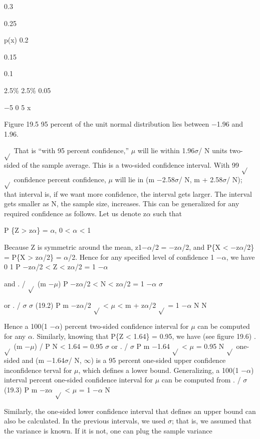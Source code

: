 0.3

0.25

p(x) 0.2

0.15

0.1

2.5\% 2.5\% 0.05

$-$5 0 5 x

Figure 19.5 95 percent of the unit normal distribution lies between $-$1.96 and 1.96.

$\sqrt{}$ That is “with 95 percent confidence,” $\mu$ will lie within 1.96$\sigma$/ N units two-sided of the sample average. This is a two-sided confidence interval. With 99 $\sqrt{}$ $\sqrt{}$ confidence percent confidence, $\mu$ will lie in (m $-$2.58$\sigma$/ N, m + 2.58$\sigma$/ N); that interval is, if we want more confidence, the interval gets larger. The interval gets smaller as N, the sample size, increases. This can be generalized for any required confidence as follows. Let us denote z$\alpha$ such that

P \{Z > z$\alpha$\} = $\alpha$, 0 < $\alpha$ < 1

Because Z is symmetric around the mean, z1$-$$\alpha$/2 = $-$z$\alpha$/2, and P\{X < $-$z$\alpha$/2\} = P\{X > z$\alpha$/2\} = $\alpha$/2. Hence for any specified level of confidence 1 $-$$\alpha$, we have 0 1 P $-$z$\alpha$/2 < Z < z$\alpha$/2 = 1 $-$$\alpha$

and . / $\sqrt{}$ (m $-$$\mu$) P $-$z$\alpha$/2 < N < z$\alpha$/2 = 1 $-$$\alpha$ $\sigma$

or . / $\sigma$ $\sigma$ (19.2) P m $-$z$\alpha$/2 $\sqrt{}$ < $\mu$ < m + z$\alpha$/2 $\sqrt{}$ = 1 $-$$\alpha$ N N

Hence a 100(1 $-$$\alpha$) percent two-sided confidence interval for $\mu$ can be computed for any $\alpha$. Similarly, knowing that P\{Z < 1.64\} = 0.95, we have (see figure 19.6) .$\sqrt{}$ (m $-$$\mu$) / P N < 1.64 = 0.95 $\sigma$ or . / $\sigma$ P m $-$1.64 $\sqrt{}$ < $\mu$ = 0.95 N $\sqrt{}$ one-sided and (m $-$1.64$\sigma$/ N, $\infty$) is a 95 percent one-sided upper confidence inconfidence terval for $\mu$, which defines a lower bound. Generalizing, a 100(1 $-$$\alpha$) interval percent one-sided confidence interval for $\mu$ can be computed from . / $\sigma$ (19.3) P m $-$z$\alpha$ $\sqrt{}$ < $\mu$ = 1 $-$$\alpha$ N

Similarly, the one-sided lower confidence interval that defines an upper bound can also be calculated. In the previous intervals, we used $\sigma$; that is, we assumed that the variance is known. If it is not, one can plug the sample variance

